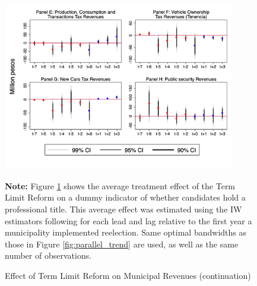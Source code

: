 \documentclass[12pt]{amsart}
\numberwithin{equation}{section}
\theoremstyle{definition}
\theoremstyle{definition}
\theoremstyle{definition}
\begin{document}
\begin{figure}[h]   
\centering
 \caption{Effect of Term Limit Reform on Municipal Revenues (continuation)}
 \label{fig:revenues2}
\includegraphics[width=0.9\textwidth]{../Figures/revenues_allyears2.png}
       \captionsetup{justification=centering}
         
 \textbf{Note:} Figure \ref{fig:revenues2} shows the average treatment effect of the Term Limit Reform on a dummy indicator of whether candidates hold a professional title. This average effect was estimated using the IW estimators following \citet{abraham_sun_2020} for each lead and lag relative to the first year a municipality implemented reelection. Same optimal bandwidths as those in Figure \ref{fig:parallel_trend} are used, as well as the same number of observations.  
          
\end{figure}     
\end{document}
